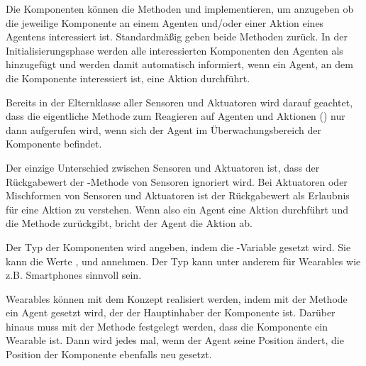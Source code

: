 Die Komponenten können die Methoden  und  implementieren, um anzugeben ob die jeweilige Komponente an einem Agenten und/oder einer Aktion eines Agentens interessiert ist. Standardmäßig geben beide Methoden  zurück. In der Initialisierungsphase werden alle interessierten Komponenten den Agenten als  hinzugefügt und werden damit automatisch informiert, wenn ein Agent, an dem die Komponente interessiert ist, eine Aktion durchführt.

 Bereits in der Elternklasse  aller Sensoren und Aktuatoren wird darauf geachtet, dass die eigentliche Methode zum Reagieren auf Agenten und Aktionen () nur dann aufgerufen wird, wenn sich der Agent im Überwachungsbereich der Komponente befindet.

Der einzige Unterschied zwischen Sensoren und Aktuatoren ist, dass der Rückgabewert der -Methode von Sensoren ignoriert wird. Bei Aktuatoren oder Mischformen von Sensoren und Aktuatoren ist der Rückgabewert als Erlaubnis für eine Aktion zu verstehen. Wenn also ein Agent eine Aktion durchführt und die Methode  zurückgibt, bricht der Agent die Aktion ab.

Der Typ der Komponenten wird angeben, indem die -Variable gesetzt wird. Sie kann die Werte ,  und  annehmen. Der Typ  kann unter anderem für Wearables wie z.B. Smartphones sinnvoll sein.

Wearables können mit dem Konzept realisiert werden, indem mit der Methode  ein Agent gesetzt wird, der der Hauptinhaber der Komponente ist. Darüber hinaus muss mit der Methode  festgelegt werden, dass die Komponente ein Wearable ist. Dann wird jedes mal, wenn der Agent seine Position ändert, die Position der Komponente ebenfalls neu gesetzt.
